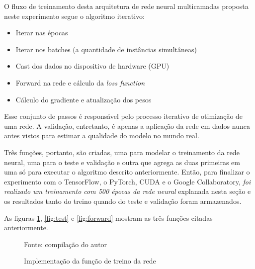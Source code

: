 O fluxo de treinamento desta arquitetura de rede neural multicamadas proposta neste experimento segue o algoritmo iterativo:

\begin{itemize}
	\item Iterar nas épocas
	\item Iterar nos batches (a quantidade de instâncias simultâneas)
	\item Cast dos dados no dispositivo de hardware (GPU)
	\item Forward na rede e cálculo da \textit{loss function}
	\item Cálculo do gradiente e atualização dos pesos
\end{itemize}

Esse conjunto de passos é responsável pelo processo iterativo de otimização de uma rede. A validação, entretanto, é apenas a aplicação da rede em dados nunca antes vistos para estimar a qualidade do modelo no mundo real.

Três funções, portanto, são criadas, uma para modelar o treinamento da rede neural, uma para o teste e validação e outra que agrega as duas primeiras em uma só para executar o algoritmo descrito anteriormente. Então, para finalizar o experimento com o TensorFlow, o PyTorch, CUDA e o Google Collaboratory, \textit{foi realizado um treinamento com 500 épocas da rede neural} explanada nesta seção e os resultados tanto do treino quando do teste e validação foram armazenados.

As figuras \ref{fig:train}, \ref{fig:test} e \ref{fig:forward} mostram as três funções citadas anteriormente.

\begin{figure}[H]
	\centering
	\caption{Implementação da função de treino da rede}
	
	\label{fig:train}
	{\scriptsize Fonte: compilação do autor}
\end{figure}


